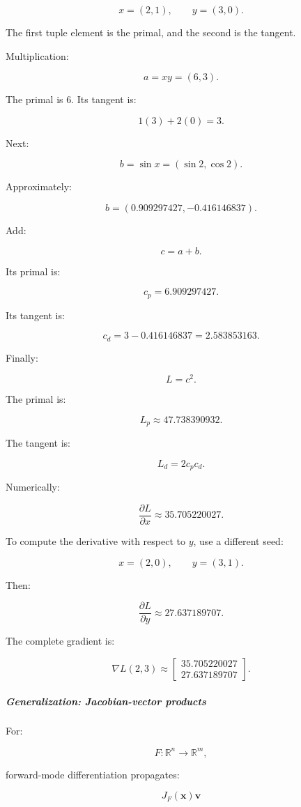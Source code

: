 \[
x=(2,1),\qquad y=(3,0).
\]

The first tuple element is the primal, and the second is the tangent.

Multiplication:

\[
a=xy=(6,3).
\]

The primal is \(6\). Its tangent is:

\[
1(3)+2(0)=3.
\]

Next:

\[
b=\sin x = (\sin2,\cos2).
\]

Approximately:

\[
b=(0.909297427,-0.416146837).
\]

Add:

\[
c=a+b.
\]

Its primal is:

\[
c_p=6.909297427.
\]

Its tangent is:

\[
c_d=3-0.416146837 =2.583853163.
\]

Finally:

\[
L=c^2.
\]

The primal is:

\[
L_p\approx47.738390932.
\]

The tangent is:

\[
L_d=2c_pc_d.
\]

Numerically:

\[
\boxed{ \frac{\partial L}{\partial x} \approx35.705220027 }.
\]

To compute the derivative with respect to \(y\), use a different seed:

\[
x=(2,0),\qquad y=(3,1).
\]

Then:

\[
\boxed{ \frac{\partial L}{\partial y} \approx27.637189707 }.
\]

The complete gradient is:

\[
\boxed{ \nabla L(2,3) \approx \begin{bmatrix} 35.705220027\\ 27.637189707 \end{bmatrix} }.
\]

\subparagraph{Generalization: Jacobian-vector products}\label{generalization-jacobian-vector-products}

For:

\[
F:\mathbb R^n\rightarrow\mathbb R^m,
\]

forward-mode differentiation propagates:

\[
\boxed{ J_F(\mathbf x)\mathbf v }
\]

